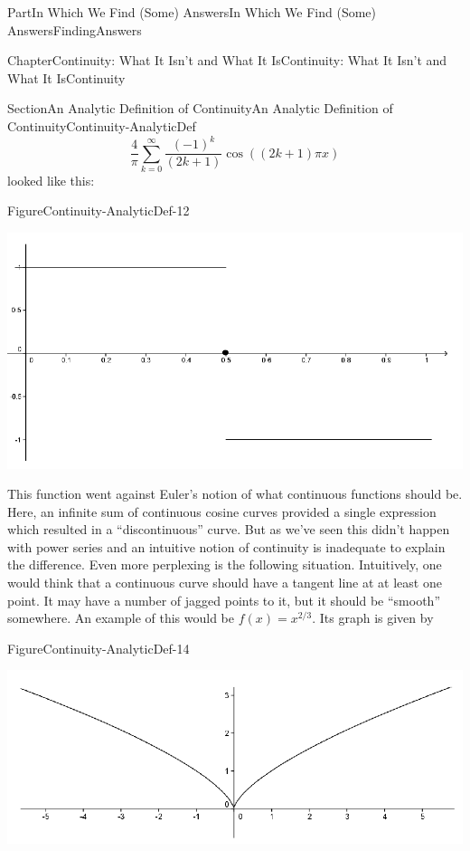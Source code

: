 \documentclass[oneside,10pt,]{book}
\numberwithin{equation}{part}
\begin{document}
\begin{partptx}{Part}{In Which We Find (Some) Answers}{}{In Which We Find (Some) Answers}{}{}{FindingAnswers}
\begin{chapterptx}{Chapter}{Continuity: What It Isn't and What It Is}{}{Continuity: What It Isn't and What It Is}{}{}{Continuity}
\begin{sectionptx}{Section}{An Analytic Definition of Continuity}{}{An Analytic Definition of Continuity}{}{}{Continuity-AnalyticDef}
\begin{equation*}
\frac{4}{\pi}\sum_{k=0}^\infty\frac{\left(-1\right)^k}{\left(2k+1\right)} \cos \left(\left(2k+1\right)\pi x\right)
\end{equation*}
looked like this:%
\begin{figureptx}{Figure}{}{Continuity-AnalyticDef-12}{}%
\begin{image}{0.125}{0.75}{0.125}{}%
\includegraphics[width=\linewidth]{external/images/Ch5fig1.png}
\end{image}%
\tcblower
\end{figureptx}%
This function went against Euler's notion of what continuous functions should be.  Here, an infinite sum of continuous cosine curves provided a single expression which resulted in a ``discontinuous'' curve.  But as we've seen this didn't happen with power series and an intuitive notion of continuity is inadequate to explain the difference.  Even more perplexing is the following situation.  Intuitively, one would think that a continuous curve should have a tangent line at at least one point.  It may have a number of jagged points to it, but it should be ``smooth'' somewhere.  An example of this would be \(f(x)=x^{2/3}\).  Its graph is given by%
\begin{figureptx}{Figure}{}{Continuity-AnalyticDef-14}{}%
\begin{image}{0.125}{0.75}{0.125}{}%
\includegraphics[width=\linewidth]{external/images/Ch5fig2.png}

\end{image}
\end{figureptx}
\end{sectionptx}
\end{chapterptx}
\end{partptx}
\end{document}
